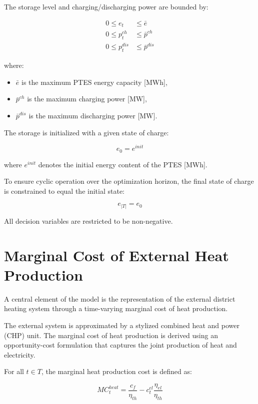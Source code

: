 The storage level and charging/discharging power are bounded by:

\begin{align}
0 \le e_t &\le \bar{e} \\
0 \le p^{ch}_{t} &\le \bar{p}^{ch} \\
0 \le p^{dis}_{t} &\le \bar{p}^{dis}
\end{align}

where:
\begin{itemize}
    \item \(\bar{e}\) is the maximum PTES energy capacity [MWh],
    \item \(\bar{p}^{ch}\) is the maximum charging power [MW],
    \item \(\bar{p}^{dis}\) is the maximum discharging power [MW].
\end{itemize}

The storage is initialized with a given state of charge:

\begin{equation}
e_0 = e^{init}
\end{equation}

where \(e^{init}\) denotes the initial energy content of the PTES [MWh].

To ensure cyclic operation over the optimization horizon, the final state of charge is constrained to equal the initial state:

\begin{equation}
e_{|T|} = e_0
\end{equation}

All decision variables are restricted to be non-negative.

\section{Marginal Cost of External Heat Production}

A central element of the model is the representation of the external district heating system through a time-varying marginal cost of heat production.

The external system is approximated by a stylized combined heat and power (CHP) unit. The marginal cost of heat production is derived using an opportunity-cost formulation that captures the joint production of heat and electricity.

For all \( t \in T \), the marginal heat production cost is defined as:

\begin{equation}
MC^{heat}_{t}
=
\frac{c_f}{\eta_{th}}
-
c^{el}_{t}\frac{\eta_{el}}{\eta_{th}}
\end{equation}

